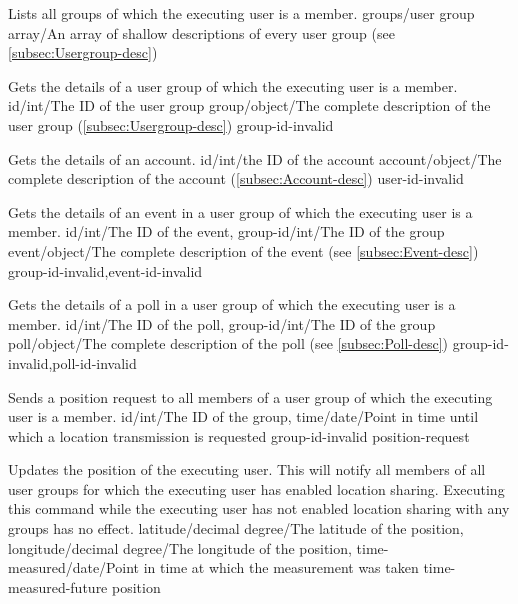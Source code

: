 \documentclass[parskip=full,11pt]{scrartcl}
\begin{document}
{Lists all groups of which the executing user is a member.}
{}
{groups/user group array/An array of shallow descriptions of every user group
(see \ref{subsec:Usergroup-desc})}
{}
{}

{Gets the details of a user group of which the executing user is a member.}
{id/int/The ID of the user group}
{group/object/The complete description of the user group
(\ref{subsec:Usergroup-desc})}
{group-id-invalid}
{}

{Gets the details of an account.}
{id/int/the ID of the account}
{account/object/The complete description of the account
(\ref{subsec:Account-desc})}
{user-id-invalid}
{}

{Gets the details of an event in a user group of which the executing user is
a member.}
{id/int/The ID of the event,
group-id/int/The ID of the group}
{event/object/The complete description of the event (see \ref{subsec:Event-desc})}
{group-id-invalid,event-id-invalid}
{}

{Gets the details of a poll in a user group of which the executing user is
a member.}
{id/int/The ID of the poll,
group-id/int/The ID of the group}
{poll/object/The complete description of the poll (see \ref{subsec:Poll-desc})}
{group-id-invalid,poll-id-invalid}
{}

{Sends a position request to all members of a user group of which the executing
user is a member.}
{id/int/The ID of the group,
time/date/Point in time until which a location transmission is requested}
{}
{group-id-invalid}
{position-request}

{Updates the position of the executing user.
This will notify all members of all user groups for which the executing user
has enabled location sharing.
Executing this command while the executing user has not enabled location
sharing with any groups has no effect.}
{latitude/decimal degree/The latitude of the position,
longitude/decimal degree/The longitude of the position,
time-measured/date/Point in time at which the measurement was taken}
{}
{time-measured-future}
{position}
\end{document}
